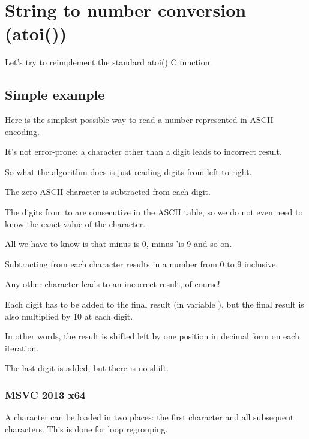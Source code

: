 \section{String to number conversion (atoi())}


Let's try to reimplement the standard atoi() C function.

\subsection{Simple example}

Here is the simplest possible way to read a number represented in \ac{ASCII} encoding.

It's not error-prone: a character other than a digit leads to incorrect result.



So what the algorithm does is just reading digits from left to right.

The zero \ac{ASCII} character is subtracted from each digit. 

The digits from  to  are consecutive in the \ac{ASCII} table, so 
we do not even need to know the exact value of the  character.

All we have to know is that  minus  is 0,  minus 'is 9 and so on.

Subtracting  from each character results in a number from 0 to 9 inclusive.

Any other character leads to an incorrect result, of course!

Each digit has to be added to the final result (in variable ), but the final result
is also multiplied by 10 at each digit.

In other words, the result is shifted left by one position in decimal form on each iteration.

The last digit is added, but there is no shift.

\subsubsection{\Optimizing MSVC 2013 x64}



A character can be loaded in two places: the first character and all subsequent characters.
This is done for loop regrouping.


